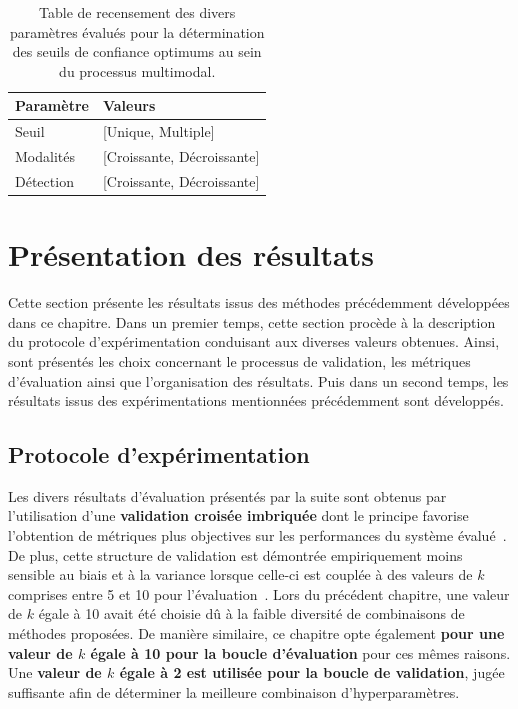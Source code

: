 \begin{table}[H]
    \centering
    \begin{tabular}{ll}
        \toprule 
        Paramètre                   & Valeurs                   \\ \midrule
        Seuil                       & [Unique, Multiple]        \\ \midrule
        Modalités                   & [Croissante, Décroissante]\\ \midrule
        Détection                   & [Croissante, Décroissante]\\ \bottomrule
    \end{tabular}
    \caption{Table de recensement des divers paramètres évalués pour la détermination des seuils de confiance optimums au sein du processus multimodal.}
    \label{tab:multimodal_confidence_model_values}
\end{table}
 
\clearpage

\section{Présentation des résultats}
Cette section présente les résultats issus des méthodes précédemment développées dans ce chapitre. Dans un premier temps, cette section procède à la description du protocole d'expérimentation conduisant aux diverses valeurs obtenues. Ainsi, sont présentés les choix concernant le processus de validation, les métriques d'évaluation ainsi que l'organisation des résultats. Puis dans un second temps, les résultats issus des expérimentations mentionnées précédemment sont développés.\par

\subsection{Protocole d’expérimentation}
Les divers résultats d'évaluation présentés par la suite sont obtenus par l'utilisation d'une \textbf{validation croisée imbriquée} dont le principe favorise l'obtention de métriques plus objectives sur les performances du système évalué~\cite{Cawley2010}. De plus, cette structure de validation est démontrée empiriquement moins sensible au biais et à la variance lorsque celle-ci est couplée à des valeurs de $k$ comprises entre 5 et 10 pour l'évaluation~\cite{James2013}. Lors du précédent chapitre, une valeur de $k$ égale à 10 avait été choisie dû à la faible diversité de combinaisons de méthodes proposées. De manière similaire, ce chapitre opte également \textbf{pour une valeur de $k$ égale à 10 pour la boucle d'évaluation} pour ces mêmes raisons. Une \textbf{valeur de $k$ égale à 2 est utilisée pour la boucle de validation}, jugée suffisante afin de déterminer la meilleure combinaison d'hyperparamètres.\par


